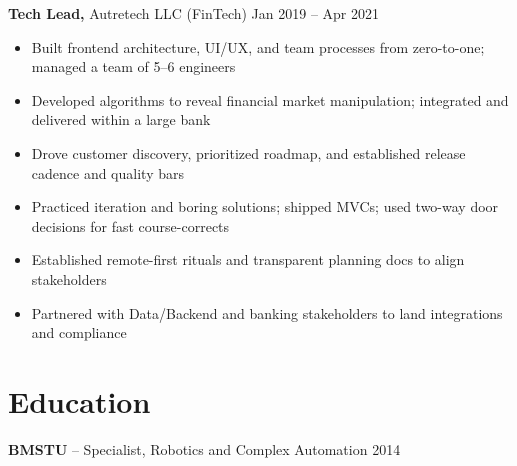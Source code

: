\documentclass[11pt]{article}       %
\begin{document}
\textbf{Tech Lead,} Autretech LLC (FinTech) \hfill Jan 2019 -- Apr 2021 \\
\vspace{-9pt}
\begin{itemize}
  \item Built frontend architecture, UI/UX, and team processes from zero-to-one; managed a team of 5--6 engineers
  \item Developed algorithms to reveal financial market manipulation; integrated and delivered within a large bank
  \item Drove customer discovery, prioritized roadmap, and established release cadence and quality bars
  \item Practiced iteration and boring solutions; shipped MVCs; used two-way door decisions for fast course-corrects
  \item Established remote-first rituals and transparent planning docs to align stakeholders
  \item Partnered with Data/Backend and banking stakeholders to land integrations and compliance
\end{itemize}


\vspace{-18.5pt}

\section*{Education}
\textbf{BMSTU} -- Specialist, Robotics and Complex Automation \hfill 2014
\end{document}
